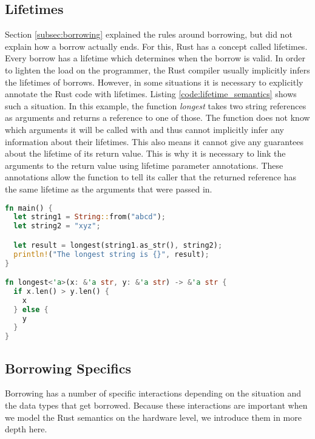 \subsection{Lifetimes}
Section \ref{subsec:borrowing} explained the rules around borrowing, but did not explain how a borrow actually ends.
For this, Rust has a concept called lifetimes.
Every borrow has a lifetime which determines when the borrow is valid.
In order to lighten the load on the programmer, the Rust compiler usually implicitly infers the lifetimes of borrows.
However, in some situations it is necessary to explicitly annotate the Rust code with lifetimes.
Listing \ref{code:lifetime_semantics} shows such a situation.
In this example, the function \textit{longest} takes two string references as arguments and returns a reference to one of those.
The function does not know which arguments it will be called with and thus cannot implicitly infer any information about their lifetimes.
This also means it cannot give any guarantees about the lifetime of its return value.
This is why it is necessary to link the arguments to the return value using lifetime parameter annotations.
These annotations allow the function to tell its caller that the returned reference has the same lifetime as the arguments that were passed in.
\begin{lstlisting}[language=Rust,frame=single,caption=Lifetime Example,label=code:lifetime_semantics]
fn main() {
  let string1 = String::from("abcd");
  let string2 = "xyz";

  let result = longest(string1.as_str(), string2);
  println!("The longest string is {}", result);
}

fn longest<'a>(x: &'a str, y: &'a str) -> &'a str {
  if x.len() > y.len() {
    x
  } else {
    y
  }
}
\end{lstlisting} %
\label{fig:lifetime_semantics}

\subsection{Borrowing Specifics}
Borrowing has a number of specific interactions depending on the situation and the data types that get borrowed.
Because these interactions are important when we model the Rust semantics on the hardware level, we introduce them in more depth here.

